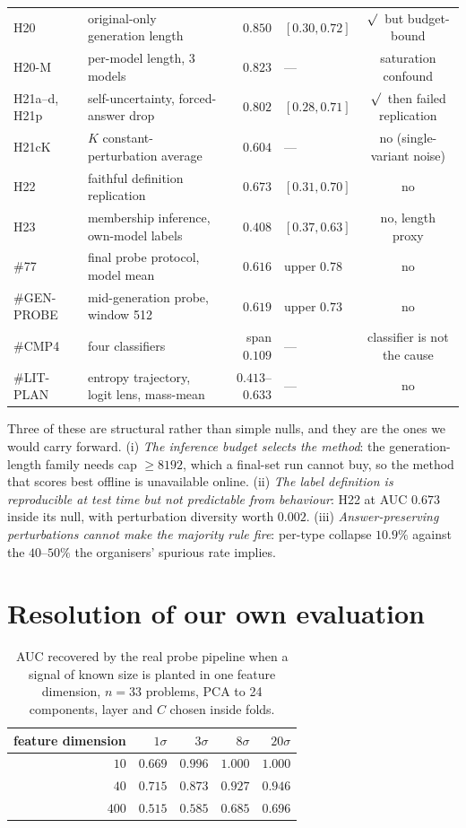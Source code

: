 \documentclass[10pt]{article}
\providecommand{\checkmark}{\ensuremath{\surd}}
\newcommand{\X}{\checkmark}
\begin{document}
\begin{table}[h]
\begin{tabular}{llrlc}
H20 & original-only generation length & $0.850$ & $[0.30,0.72]$ & \X\ but budget-bound \\
H20-M & per-model length, 3 models & $0.823$ & --- & saturation confound \\
H21a--d, H21p & self-uncertainty, forced-answer drop & $0.802$ & $[0.28,0.71]$ & \X\ then failed replication \\
H21cK & $K$ constant-perturbation average & $0.604$ & --- & no (single-variant noise) \\
H22 & faithful definition replication & $0.673$ & $[0.31,0.70]$ & no \\
H23 & membership inference, own-model labels & $0.408$ & $[0.37,0.63]$ & no, length proxy \\
\#77 & final probe protocol, model mean & $0.616$ & upper $0.78$ & no \\
\#GEN-PROBE & mid-generation probe, window 512 & $0.619$ & upper $0.73$ & no \\
\#CMP4 & four classifiers & span $0.109$ & --- & classifier is not the cause \\
\#LIT-PLAN & entropy trajectory, logit lens, mass-mean & $0.413$--$0.633$ & --- & no \\
\bottomrule
\end{tabular}
\end{table}

Three of these are structural rather than simple nulls, and they are the ones we would carry
forward. (i) \emph{The inference budget selects the method}: the generation-length family needs cap
$\ge 8192$, which a final-set run cannot buy, so the method that scores best offline is unavailable
online. (ii) \emph{The label definition is reproducible at test time but not predictable from
behaviour}: H22 at AUC $0.673$ inside its null, with perturbation diversity worth $0.002$.
(iii) \emph{Answer-preserving perturbations cannot make the majority rule fire}: per-type collapse
$10.9\%$ against the $40$--$50\%$ the organisers' spurious rate implies.

\section{Resolution of our own evaluation}
\label{app:power}
\begin{table}[h]
\centering\small
\caption{AUC recovered by the real probe pipeline when a signal of known size is planted in one
feature dimension, $n{=}33$ problems, PCA to 24 components, layer and $C$ chosen inside folds.}
\label{tab:power}
\begin{tabular}{rrrrr}
\toprule
feature dimension & $1\sigma$ & $3\sigma$ & $8\sigma$ & $20\sigma$ \\
\midrule
$10$ & $0.669$ & $0.996$ & $1.000$ & $1.000$ \\
$40$ & $0.715$ & $0.873$ & $0.927$ & $0.946$ \\
$400$ & $0.515$ & $0.585$ & $0.685$ & $\mathbf{0.696}$ \\
\bottomrule
\end{tabular}
\end{table}
\end{document}
